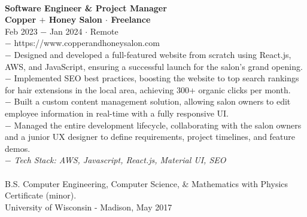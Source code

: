 \documentclass{resume}
\begin{document}
\begin{flushleft}

\\[2mm]
\footnotesize{\bf Software Engineer \& Project Manager}\\
\footnotesize{\bf Copper $+$ Honey Salon $\cdot$ Freelance}\\
\footnotesize{Feb 2023 $-$ Jan 2024 $\cdot$ Remote}\\[1mm]
{\scriptsize
	$-$ https://www.copperandhoneysalon.com\\
	$-$ Designed and developed a full-featured website from scratch using React.js, AWS, and JavaScript, ensuring a successful launch for the salon’s grand opening.\\
	$-$ Implemented SEO best practices, boosting the website to top search rankings for hair extensions in the local area, achieving 300+ organic clicks per month.\\
	$-$ Built a custom content management solution, allowing salon owners to edit employee information in real-time with a fully responsive UI.\\
	$-$ Managed the entire development lifecycle, collaborating with the salon owners and a junior UX designer to define requirements, project timelines, and feature demos.\\
	$-$ \textit{Tech Stack: AWS, Javascript, React.js, Material UI, SEO}
}\\[3mm]

 \\
{\footnotesize
	B.S. Computer Engineering, Computer Science, \& Mathematics with Physics Certificate (minor). \\
	University of Wisconsin - Madison, May 2017 } \\[5mm]


\end{flushleft}
\end{document}
